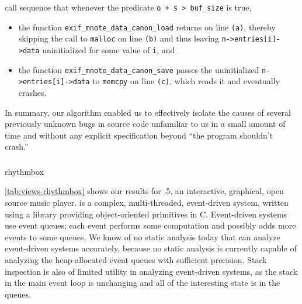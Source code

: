 call sequence that whenever the predicate \texttt{o + s > buf\_size} is true,
\begin{itemize}
\item the function \texttt{exif\_mnote\_data\_canon\_load} returns on
  line \texttt{(a)}, thereby skipping the call to \texttt{malloc} on
  line \texttt{(b)} and thus leaving \texttt{n->entries[i]->data}
  uninitialized for some value of \texttt{i}, and

\item the function \texttt{exif\_mnote\_data\_canon\_save} passes the
  uninitialized \texttt{n->entries[i]->data} to \texttt{memcpy} on line \texttt{(c)}, which reads it and eventually crashes.
\end{itemize}

In summary, our algorithm enabled us to effectively isolate the causes
of several previously unknown bugs in source code unfamiliar to us in
a small amount of time and without any explicit specification beyond
``the program shouldn't crash.''

\subsubsection{\rhythmbox}

\begingroup
\setlength{\segunit}{10pt}
\begin{view}[\tiny]{\rhythmbox}{rhythmbox}
  
\end{view}
\endgroup

\autoref{tab:views-rhythmbox} shows our results for .5,
an interactive, graphical, open source music player.  \rhythmbox is a
complex, multi-threaded, event-driven system, written using a library
providing object-oriented primitives in C.  Event-driven systems use
event queues; each event performs some computation and possibly adds
more events to some queues.  We know of no static analysis today that
can analyze event-driven systems accurately, because no static
analysis is currently capable of analyzing the heap-allocated event
queues with sufficient precision.  Stack inspection is also of
limited utility in analyzing event-driven systems, as the stack in the
main event loop is unchanging and all of the interesting state is in
the queues.

